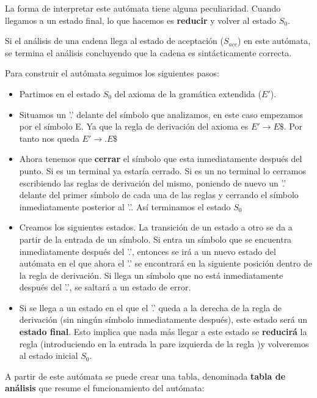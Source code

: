 \documentclass{apuntes}
\begin{document}
\begin{example}
La forma de interpretar este autómata tiene alguna peculiaridad. Cuando llegamos a un estado final, lo que hacemos es \textbf{reducir} y volver al estado $S_0$.

Si el análisis de una cadena llega al estado de aceptación ($S_{acc}$) en este autómata, se termina el análisis concluyendo que la cadena es sintácticamente correcta.

Para construir el autómata seguimos los siguientes pasos:
\begin{itemize}
\item Partimos en el estado $S_0$ del axioma de la gramática extendida ($E'$).
\item Situamos un '.' delante del símbolo que analizamos, en este caso empezamos por el símbolo E. Ya que la regla de derivación del axioma es $E' \rightarrow E\$$. Por tanto nos queda $E' \rightarrow .E\$$
\item Ahora tenemos que \textbf{cerrar} el símbolo que esta inmediatamente después del punto. Si es un terminal ya estaría cerrado. Si es un no terminal lo cerramos escribiendo las reglas de derivación del mismo, poniendo de nuevo un '.' delante del primer símbolo de cada una de las reglas y cerrando el símbolo inmediatamente posterior al '.'. Así terminamos el estado $S_0$
\item Creamos los siguientes estados. La transición de un estado a otro se da a partir de la entrada de un símbolo. Si entra un símbolo que se encuentra inmediatamente después del '.', entonces se irá a un nuevo estado del autómata en el que ahora el '.' se encontrará en la siguiente posición dentro de la regla de derivación. Si llega un símbolo que no está inmediatamente después del '.', se saltará a un estado de error.
\item Si se llega a un estado en el que el '.' queda a la derecha de la regla de derivación (sin ningún símbolo inmediatamente después), este estado será un \textbf{estado final}. Esto implica que nada más llegar a este estado se \textbf{reducirá} la regla (introduciendo en la entrada la pare izquierda de la regla )y volveremos al estado inicial $S_0$.
\end{itemize}

A partir de este autómata se puede crear una tabla, denominada \textbf{tabla de análisis} que resume el funcionamiento del autómata:


\end{example}
\end{document}
